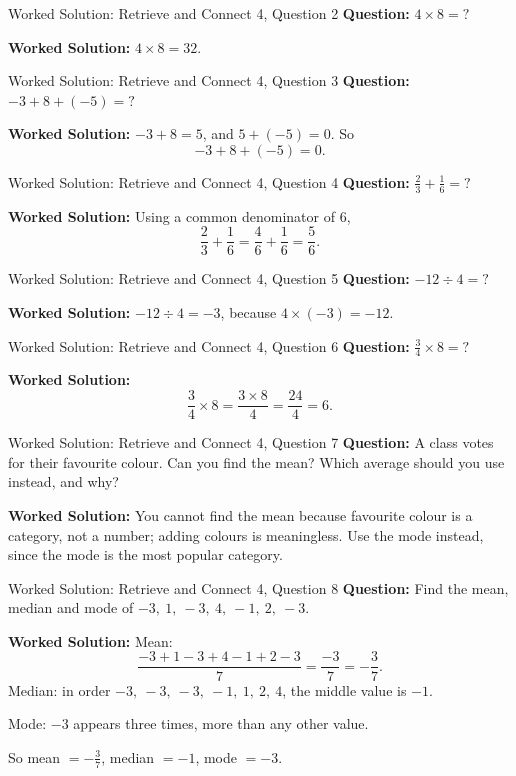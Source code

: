 \documentclass{beamer}
\begin{document}
\begin{frame}{Worked Solution: Retrieve and Connect 4, Question 2}
\small
\textbf{Question:} \(4 \times 8=\mathord{?}\)

\smallskip
\textbf{Worked Solution:} \(4 \times 8 = 32\).
\end{frame}

\begin{frame}{Worked Solution: Retrieve and Connect 4, Question 3}
\small
\textbf{Question:} \(-3+8+(-5)=\mathord{?}\)

\smallskip
\textbf{Worked Solution:} \(-3+8=5\), and \(5+(-5)=0\). So
\[
-3+8+(-5)=0.
\]
\end{frame}

\begin{frame}{Worked Solution: Retrieve and Connect 4, Question 4}
\small
\textbf{Question:} \(\frac23+\frac16=\mathord{?}\)

\smallskip
\textbf{Worked Solution:} Using a common denominator of \(6\),
\[
\frac23+\frac16=\frac46+\frac16=\frac56.
\]
\end{frame}

\begin{frame}{Worked Solution: Retrieve and Connect 4, Question 5}
\small
\textbf{Question:} \(-12 \div 4=\mathord{?}\)

\smallskip
\textbf{Worked Solution:} \(-12 \div 4 = -3\), because \(4 \times (-3)=-12\).
\end{frame}

\begin{frame}{Worked Solution: Retrieve and Connect 4, Question 6}
\small
\textbf{Question:} \(\frac34 \times 8=\mathord{?}\)

\smallskip
\textbf{Worked Solution:}
\[
\frac34 \times 8 = \frac{3\times8}{4}=\frac{24}{4}=6.
\]
\end{frame}

\begin{frame}{Worked Solution: Retrieve and Connect 4, Question 7}
\small
\textbf{Question:} A class votes for their favourite colour. Can you find the mean? Which average should you use instead, and why?

\smallskip
\textbf{Worked Solution:} You cannot find the mean because favourite colour is a category, not a number; adding colours is meaningless. Use the mode instead, since the mode is the most popular category.
\end{frame}

\begin{frame}{Worked Solution: Retrieve and Connect 4, Question 8}
\small
\textbf{Question:} Find the mean, median and mode of \(-3,\ 1,\ -3,\ 4,\ -1,\ 2,\ -3\).

\smallskip
\textbf{Worked Solution:} Mean:
\[
\frac{-3+1-3+4-1+2-3}{7}=\frac{-3}{7}=-\frac37.
\]
Median: in order \(-3,\ -3,\ -3,\ -1,\ 1,\ 2,\ 4\), the middle value is \(-1\).

Mode: \(-3\) appears three times, more than any other value.

So mean \(=-\frac37\), median \(=-1\), mode \(=-3\).
\end{frame}
\end{document}
